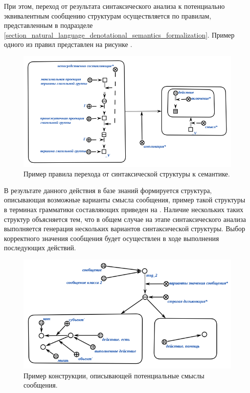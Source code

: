 При этом, переход от результата синтаксического анализа к потенциально эквивалентным сообщению структурам осуществляется по правилам, представленным в подразделе \ref{section_natural_language_denotational_semantics_formalization}.
Пример одного из правил представлен на рисунке \textit{}.

\begin{figure}[h]
    \centering
    \includegraphics[scale=0.8]{images/part4/chapter_nl_interfaces/d_sem_3}
    \caption{Пример правила перехода от синтаксической структуры к семантике.}
    \label{fig:transition_to_semanic_rule}
\end{figure}

В результате данного действия в базе знаний формируется структура, описывающая возможные варианты смысла сообщения, пример такой структуры в терминах грамматики составляющих приведен на \textit{}.
Наличие нескольких таких структур объясняется тем, что в общем случае на этапе синтаксического анализа выполняется генерация нескольких вариантов синтаксической структуры.
Выбор корректного значения сообщения будет осуществлен в ходе выполнения последующих действий.

\begin{figure}[h]
    \centering
    \includegraphics[scale=0.8]{images/part4/chapter_nl_interfaces/messsage_meaning_variants}
    \caption{Пример конструкции, описывающей потенциальные смыслы сообщения.}
    \label{fig:messsage_meaning_variants}
\end{figure}

